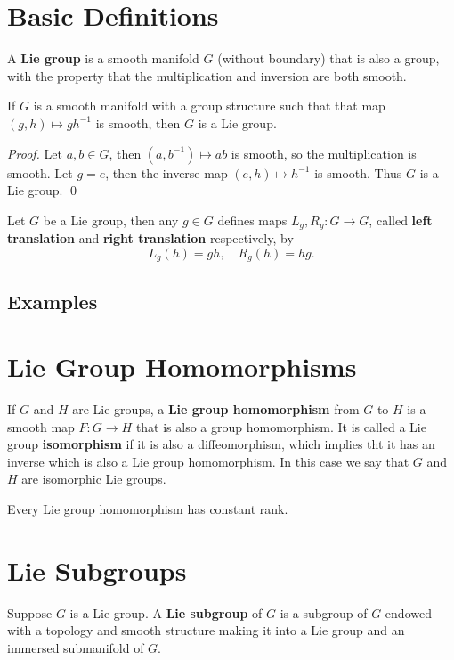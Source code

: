 \section{Basic Definitions}
\begin{definition}
    A \textbf{Lie group} is a smooth manifold $G$ (without boundary) that is also a group, with the property that the multiplication and inversion are both smooth. 
\end{definition}
\begin{proposition}
    If $G$ is a smooth manifold with a group structure such that that map $(g,h) \mapsto gh^{-1}$ is smooth, then $G$ is a Lie group.
\end{proposition}
\begin{proof}
    Let $a,b \in G$, then $(a,b^{-1}) \mapsto ab$ is smooth, so the multiplication is smooth. 
    Let $g = e$, then the inverse map $(e,h) \mapsto h^{-1}$ is smooth. Thus $G$ is a Lie group. \qed
\end{proof}
Let $G$ be a Lie group, then any $g \in G$ defines maps $L_g, R_g:G \to G$, called \textbf{left translation} and \textbf{right translation} respectively, by 
$$L_g(h) = gh, \quad R_g(h) = hg. $$

\subsection*{Examples}
\begin{example}
    
\end{example}

\section{Lie Group Homomorphisms}
\begin{definition}
    If $G$ and $H$ are Lie groups, a \textbf{Lie group homomorphism} from $G$ to $H$ is a smooth map $F:G \to H$ that is also a group homomorphism. It is called a Lie group \textbf{isomorphism} if it is also a diffeomorphism, which implies tht it has an inverse which is also a Lie group homomorphism. In this case we say that $G$ and $H$ are isomorphic Lie groups. 
\end{definition}

\begin{theorem}
    Every Lie group homomorphism has constant rank. 
\end{theorem}

\section{Lie Subgroups}
\begin{definition}
    Suppose $G$ is a Lie group. A \textbf{Lie subgroup} of $G$ is a subgroup of $G$ endowed with a topology and smooth structure making it into a Lie group and an immersed submanifold of $G$. 
\end{definition}

